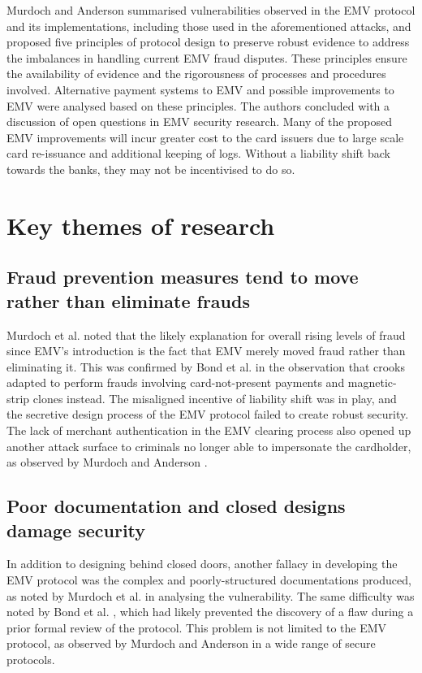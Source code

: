 \documentclass[11pt]{article}
\begin{document}
Murdoch and Anderson \cite{murdoch2014security} summarised vulnerabilities observed in the EMV protocol and its implementations, including those used in the aforementioned attacks, and proposed five principles of protocol design to preserve robust evidence to address the imbalances in handling current EMV fraud disputes. These principles ensure the availability of evidence and the rigorousness of processes and procedures involved. Alternative payment systems to EMV and possible improvements to EMV were analysed based on these principles. The authors concluded with a discussion of open questions in EMV security research. Many of the proposed EMV improvements will incur greater cost to the card issuers due to large scale card re-issuance and additional keeping of logs. Without a liability shift back towards the banks, they may not be incentivised to do so. 

\section{Key themes of research}

\subsection{Fraud prevention measures tend to move rather than eliminate frauds}

Murdoch et al. \cite[p. 433]{murdoch2010chip} noted that the likely explanation for overall rising levels of fraud since EMV's introduction is the fact that EMV merely moved fraud rather than eliminating it. This was confirmed by Bond et al. \cite[Sec. II]{bond2014chip} in the observation that crooks adapted to perform frauds involving card-not-present payments and magnetic-strip clones instead. The misaligned incentive of liability shift was in play, and the secretive design process of the EMV protocol failed to create robust security. The lack of merchant authentication in the EMV clearing process also opened up another attack surface to criminals no longer able to impersonate the cardholder, as observed by Murdoch and Anderson \cite[p. 3]{murdoch2014security}.

\subsection{Poor documentation and closed designs damage security}

In addition to designing behind closed doors, another fallacy in developing the EMV protocol was the complex and poorly-structured documentations produced, as noted by Murdoch et al. \cite[p. 439]{murdoch2010chip} in analysing the vulnerability. The same difficulty was noted by Bond et al. \cite[Sec. VI]{bond2014chip}, which had likely prevented the discovery of a flaw during a prior formal review of the protocol. This problem is not limited to the EMV protocol, as observed by Murdoch and Anderson \cite[p. 4]{murdoch2014security} in a wide range of secure protocols.
\end{document}
